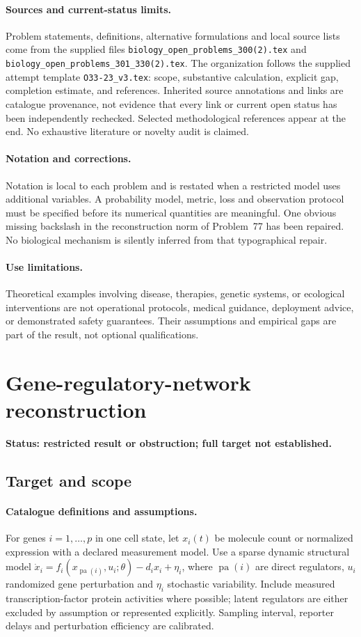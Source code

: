 \documentclass[11pt]{article}
\begin{document}
\paragraph{Sources and current-status limits.}
Problem statements, definitions, alternative formulations and local source lists
come from the supplied files
\texttt{biology\_open\_problems\_300(2).tex} and
\texttt{biology\_open\_problems\_301\_330(2).tex}.
The organization follows the supplied attempt template
\texttt{O33-23\_v3.tex}: scope, substantive calculation, explicit gap,
completion estimate, and references. Inherited source annotations and links are
catalogue provenance, not evidence that every link or current open status has
been independently rechecked. Selected methodological references appear at the
end. No exhaustive literature or novelty audit is claimed.

\paragraph{Notation and corrections.}
Notation is local to each problem and is restated when a restricted model uses
additional variables. A probability model, metric, loss and observation protocol
must be specified before its numerical quantities are meaningful. One obvious
missing backslash in the reconstruction norm of Problem~77 has been repaired.
No biological mechanism is silently inferred from that typographical repair.

\paragraph{Use limitations.}
Theoretical examples involving disease, therapies, genetic systems, or ecological
interventions are not operational protocols, medical guidance, deployment advice,
or demonstrated safety guarantees. Their assumptions and empirical gaps are part
of the result, not optional qualifications.


\section*{Gene-regulatory-network reconstruction}
\label{prob:046}
\noindent\textbf{Status: restricted result or obstruction; full target not established.}
\subsection{Target and scope}
\paragraph{Catalogue definitions and assumptions.}
For genes $i=1,\ldots,p$ in one cell state, let $x_i(t)$ be molecule count or normalized expression with a declared measurement model. Use a sparse dynamic structural model $\dot x_i=f_i(x_{\operatorname{pa}(i)},u_i;\theta)-d_ix_i+\eta_i$, where $\operatorname{pa}(i)$ are direct regulators, $u_i$ randomized gene perturbation and $\eta_i$ stochastic variability. Include measured transcription-factor protein activities where possible; latent regulators are either excluded by assumption or represented explicitly. Sampling interval, reporter delays and perturbation efficiency are calibrated.
\end{document}
